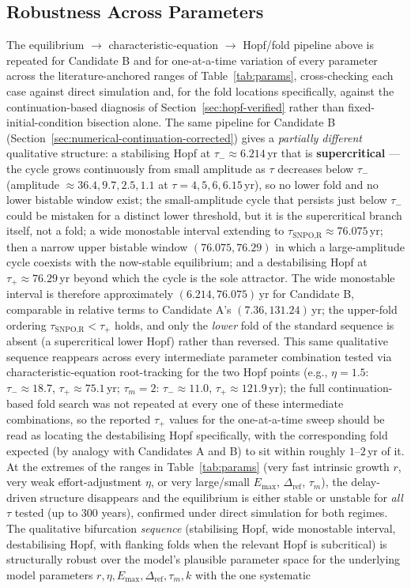 \documentclass[twocolumn,10pt]{article}
\begin{document}
\subsection{Robustness Across Parameters}
\label{sec:robustness-corrected}
The equilibrium $\to$ characteristic-equation $\to$ Hopf/fold pipeline above is repeated for Candidate B and for one-at-a-time variation of every parameter across the literature-anchored ranges of Table~\ref{tab:params}, cross-checking each case against direct simulation and, for the fold locations specifically, against the continuation-based diagnosis of Section~\ref{sec:hopf-verified} rather than fixed-initial-condition bisection alone. The same pipeline for Candidate B (Section~\ref{sec:numerical-continuation-corrected}) gives a \emph{partially different} qualitative structure: a stabilising Hopf at $\tau_-\approx6.214$\,yr that is \textbf{supercritical} — the cycle grows continuously from small amplitude as $\tau$ decreases below $\tau_-$ (amplitude $\approx36.4,9.7,2.5,1.1$ at $\tau=4,5,6,6.15$\,yr), so no lower fold and no lower bistable window exist; the small-amplitude cycle that persists just below $\tau_-$ could be mistaken for a distinct lower threshold, but it is the supercritical branch itself, not a fold; a wide monostable interval extending to $\tau_{\text{SNPO,R}}\approx76.075$\,yr; then a narrow upper bistable window $(76.075,76.29)$ in which a large-amplitude cycle coexists with the now-stable equilibrium; and a destabilising Hopf at $\tau_+\approx76.29$\,yr beyond which the cycle is the sole attractor. The wide monostable interval is therefore approximately $(6.214,76.075)$\,yr for Candidate B, comparable in relative terms to Candidate A's $(7.36,131.24)$\,yr; the upper-fold ordering $\tau_{\text{SNPO,R}}<\tau_+$ holds, and only the \emph{lower} fold of the standard sequence is absent (a supercritical lower Hopf) rather than reversed. This same qualitative sequence reappears across every intermediate parameter combination tested via characteristic-equation root-tracking for the two Hopf points (e.g., $\eta=1.5$: $\tau_-\approx18.7$, $\tau_+\approx75.1$\,yr; $\tau_m=2$: $\tau_-\approx11.0$, $\tau_+\approx121.9$\,yr); the full continuation-based fold search was not repeated at every one of these intermediate combinations, so the reported $\tau_+$ values for the one-at-a-time sweep should be read as locating the destabilising Hopf specifically, with the corresponding fold expected (by analogy with Candidates A and B) to sit within roughly $1$--$2$\,yr of it. At the extremes of the ranges in Table~\ref{tab:params} (very fast intrinsic growth $r$, very weak effort-adjustment $\eta$, or very large/small $E_{\max}$, $\Delta_{\text{ref}}$, $\tau_m$), the delay-driven structure disappears and the equilibrium is either stable or unstable for \emph{all} $\tau$ tested (up to 300 years), confirmed under direct simulation for both regimes. The qualitative bifurcation \emph{sequence} (stabilising Hopf, wide monostable interval, destabilising Hopf, with flanking folds when the relevant Hopf is subcritical) is structurally robust over the model's plausible parameter space for the underlying model parameters $r,\eta,E_{\max},\Delta_{\text{ref}},\tau_m,k$ \textemdash{} with the one systematic 
\end{document}
